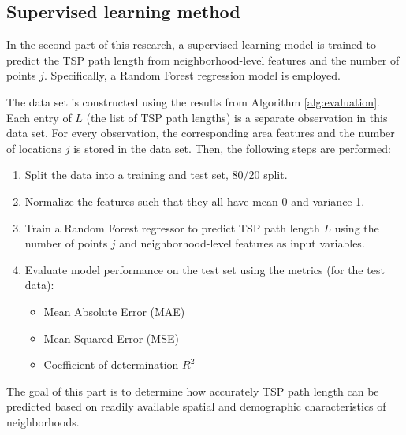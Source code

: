\subsection{Supervised learning method}
In the second part of this research, a supervised learning model is trained to predict the TSP path length from neighborhood-level features and the number of 
points \( j \). Specifically, a Random Forest regression model is employed.

The data set is constructed using the results from Algorithm \ref{alg:evaluation}. Each entry of $L$ (the list of TSP path lengths) is a separate observation
in this data set. For every observation, the corresponding area features and the number of locations $j$ is stored in the data set. Then, the following steps
are performed:
\begin{enumerate}
    \item Split the data into a training and test set, 80/20 split.
    \item Normalize the features such that they all have mean 0 and variance 1.
    \item Train a Random Forest regressor to predict TSP path length \( L \) using the number of points \( j \) and neighborhood-level features as input variables.
    \item Evaluate model performance on the test set using the metrics (for the test data):
    \begin{itemize}
        \item Mean Absolute Error (MAE)
        \item Mean Squared Error (MSE)
        \item Coefficient of determination \( R^2 \)
    \end{itemize}
\end{enumerate}

The goal of this part is to determine how accurately TSP path length can be predicted based on readily available spatial and demographic characteristics of 
neighborhoods.
